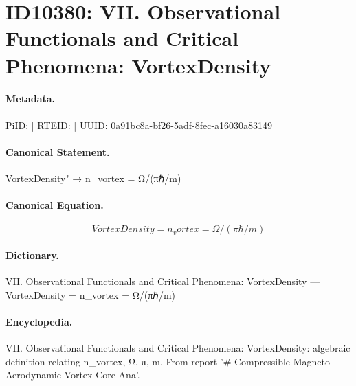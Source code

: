 \section*{ID10380: VII. Observational Functionals and Critical Phenomena: VortexDensity}
\paragraph{Metadata.}
PiID:  | RTEID:  | UUID: 0a91bc8a-bf26-5adf-8fec-a16030a83149

\paragraph{Canonical Statement.}
VortexDensity" → n\_vortex = Ω/(πℏ/m)

\paragraph{Canonical Equation.}
\[
VortexDensity = n_vortex = Ω/(πℏ/m)
\]

\paragraph{Dictionary.}
VII. Observational Functionals and Critical Phenomena: VortexDensity — VortexDensity = n\_vortex = Ω/(πℏ/m)

\paragraph{Encyclopedia.}
VII. Observational Functionals and Critical Phenomena: VortexDensity: algebraic definition relating n\_vortex, Ω, π, m. From report '\# Compressible Magneto-Aerodynamic Vortex Core Ana'.
